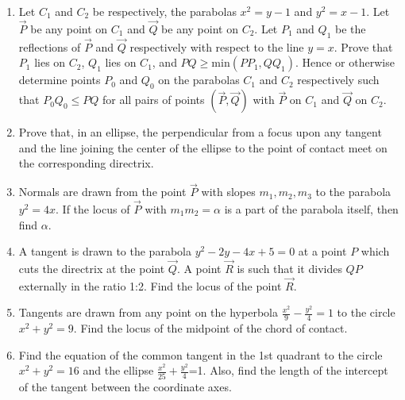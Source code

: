 \begin{enumerate}
\item Let $C_1$ and $C_2$ be respectively, the parabolas $x^2=y-1$ and $y^2=x-1$. Let $\vec{P}$ be any point on $C_1$ and $\vec{Q}$ be any point on $C_2$. Let $P_1$ and $Q_1$ be the reflections of $\vec{P}$ and $\vec{Q}$ respectively with respect to the line $y=x$. Prove that $P_1$ lies on $C_2$, $Q_1$ lies on $C_1$, and $PQ \geq \text{min}({PP_1, QQ_1})$. Hence or otherwise determine points $P_0$ and $Q_0$ on the parabolas $C_1$ and $C_2$ respectively such that $P_0Q_0 \leq PQ$ for all pairs of points $(\vec{P},\vec{Q})$ with $\vec{P}$ on $C_1$ and $\vec{Q}$ on $C_2$. \hfill{}
\item Prove that, in an ellipse, the perpendicular from a focus upon any tangent and the line joining the center of the ellipse to the point of contact meet on the corresponding directrix. \hfill{}

\item Normals are drawn from the point $\vec{P}$ with slopes $m_1, m_2, m_3$ to the parabola $y^2=4x$. If the locus of $\vec{P}$ with $m_1m_2=\alpha$ is a part of the parabola itself, then find $\alpha$. \hfill{}

\item A tangent is drawn to the parabola $y^2-2y-4x+5=0$ at a point $P$ which cuts the directrix at the point $\vec{Q}$. A point $\vec{R}$ is such that it divides $QP$ externally in the ratio 1:2. Find the locus of the point $\vec{R}$. \hfill{}

\item Tangents are drawn from any point on the hyperbola $\frac{x^2}{9}-\frac{y^2}{4}=1$ to the circle $x^2+y^2=9$. Find the locus of the midpoint of the chord of contact. \hfill{}

\item Find the equation of the common tangent in the 1st quadrant to the circle $x^2+y^2=16$ and the ellipse $\frac{x^2}{25}+\frac{y^2}{4}$=1. Also, find the length of the intercept of the tangent between the coordinate axes. \hfill{} 


\end{enumerate}
